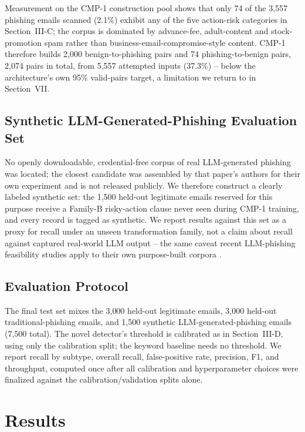 \documentclass[conference]{IEEEtran}
\begin{document}
Measurement on the CMP-1 construction pool shows that only 74 of the 3{,}557 phishing emails scanned (2.1\%) exhibit any of the five action-risk categories in Section~III-C; the corpus is dominated by advance-fee, adult-content and stock-promotion spam rather than business-email-compromise-style content. CMP-1 therefore builds 2{,}000 benign-to-phishing pairs and 74 phishing-to-benign pairs, 2{,}074 pairs in total, from 5{,}557 attempted inputs (37.3\%) -- below the architecture's own 95\% valid-pairs target, a limitation we return to in Section~VII.

\subsection{Synthetic LLM-Generated-Phishing Evaluation Set}

No openly downloadable, credential-free corpus of real LLM-generated phishing was located; the closest candidate \cite{S1} was assembled by that paper's authors for their own experiment and is not released publicly. We therefore construct a clearly labeled synthetic set: the 1{,}500 held-out legitimate emails reserved for this purpose receive a Family-B risky-action clause never seen during CMP-1 training, and every record is tagged as synthetic. We report results against this set as a proxy for recall under an unseen transformation family, not a claim about recall against captured real-world LLM output -- the same caveat recent LLM-phishing feasibility studies apply to their own purpose-built corpora \cite{sroy2023phishbots,eze2024aiphishing}.

\subsection{Evaluation Protocol}

The final test set mixes the 3{,}000 held-out legitimate emails, 3{,}000 held-out traditional-phishing emails, and 1{,}500 synthetic LLM-generated-phishing emails (7{,}500 total). The novel detector's threshold is calibrated as in Section~III-D, using only the calibration split; the keyword baseline needs no threshold. We report recall by subtype, overall recall, false-positive rate, precision, F1, and throughput, computed once after all calibration and hyperparameter choices were finalized against the calibration/validation splits alone.

\section{Results}
\end{document}
